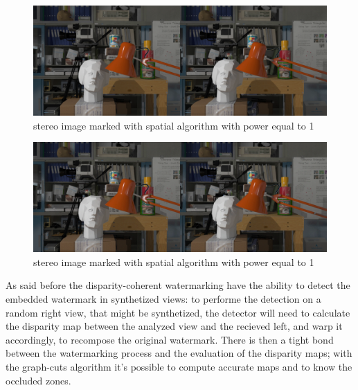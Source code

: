 \begin{figure}[h!]
\centering
\includegraphics[width=1\textwidth]{./img/marked_1_gauss.png}
\caption{\small{stereo image marked with spatial algorithm with power equal to 1}}
\label{fig:gauss1}
\end{figure}
\begin{figure}[h!]
\centering
\includegraphics[width=1\textwidth]{./img/marked_3_gauss.png}
\caption{\small{stereo image marked with spatial algorithm with power equal to 1}}
\label{fig:gauss3}
\end{figure}
  
As said before the disparity-coherent watermarking have the ability to detect the embedded watermark in synthetized views: to performe the detection on a random right view, that might be synthetized, the detector will need to calculate the disparity map between the analyzed view and the recieved left, and warp it accordingly, to recompose the original watermark.\newline 
There is then a tight bond between the watermarking process and the evaluation of the disparity maps; with the graph-cuts algorithm it's possible to compute accurate maps and to know the occluded zones.
